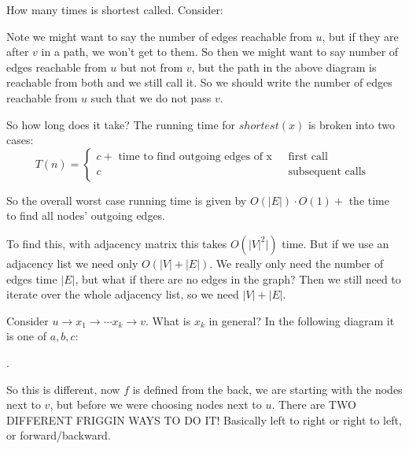\documentclass[reqno]{amsbook}
\theoremstyle{plain}
\numberwithin{section}{chapter}
\numberwithin{equation}{chapter}
\theoremstyle{definition}
\theoremstyle{remark}
\begin{document}
How many times is shortest called. Consider:
\begin{center}
\end{center}
Note we might want to say the number of edges reachable from $u$, but if they are after $v$ in a path, we won't get to them. So then we might want to say number of edges reachable from $u$ but not from $v$, but the path in the above diagram is reachable from both and we still call it. So we should write the number of edges reachable from $u$ such that we do not pass $v$. 

So how long does it take? The running time for $shortest(x)$ is broken into two cases:
$$
T(n) = 
\begin{cases}
c + \text{ time to find outgoing edges of x } & \text{ first call }\\
c & \text{ subsequent calls }
\end{cases}
$$

So the overall worst case running time is given by $O(|E|)\cdot O(1) + $ the time to find all nodes' outgoing edges. 

To find this, with adjacency matrix this takes $O(|V|^2|)$ time. But if we use an adjacency list we need only $O(|V| + |E|)$. We really only need the number of edges time $|E|$, but what if there are no edges in the graph? Then we still need to iterate over the whole adjacency list, so we need $|V| + |E|$. 

Consider $u \to x_1 \to \cdots x_k \to v$. What is $x_k$ in general? In the following diagram it is one of $a,b,c$:
\begin{center}
.
\end{center}

So this is different, now $f$ is defined from the back, we are starting with the nodes next to $v$, but before we were choosing nodes next to $u$. There are TWO DIFFERENT FRIGGIN WAYS TO DO IT! Basically left to right or right to left, or forward/backward. 
\end{document}
